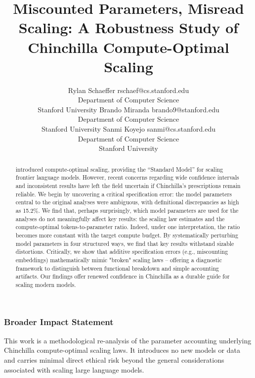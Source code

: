 \documentclass[10pt]{article} %
\title{Miscounted Parameters, Misread Scaling: A Robustness Study of Chinchilla Compute-Optimal Scaling}
\author{\name Rylan Schaeffer \email rschaef@cs.stanford.edu \\
      \addr Department of Computer Science\\
      Stanford University
      \AND
      \name Brando Miranda \email brando9@stanford.edu \\
      \addr Department of Computer Science\\
      Stanford University
      \AND
      \name Sanmi Koyejo \email sanmi@cs.stanford.edu \\
      \addr Department of Computer Science\\
      Stanford University}
\begin{document}
\maketitle

\begin{abstract}
\citet{hoffman2022chinchilla} introduced compute-optimal scaling, providing the ``Standard Model'' for scaling frontier language models.
However, recent concerns regarding wide confidence intervals and inconsistent results have left the field uncertain if Chinchilla’s prescriptions remain reliable. We begin by uncovering a critical specification error: the model parameters central to the original analyses were ambiguous, with definitional discrepancies as high as 15.2\%.
We find that, perhaps surprisingly, which model parameters are used for the analyses do not meaningfully affect key results: the scaling law estimates and the compute-optimal tokens-to-parameter ratio. Indeed, under one interpretation, the ratio becomes more constant with the target compute budget.
By systematically perturbing model parameters in four structured ways, we find that key results withstand sizable distortions. Critically, we show that additive specification errors (e.g., miscounting embeddings) mathematically mimic "broken" scaling laws -- offering a diagnostic framework to distinguish between functional breakdown and simple accounting artifacts. Our findings offer renewed confidence in Chinchilla as a durable guide for scaling modern models.
\end{abstract}






\subsubsection*{Broader Impact Statement}
This work is a methodological re-analysis of the parameter accounting underlying Chinchilla compute-optimal scaling laws. It introduces no new models or data and carries minimal direct ethical risk beyond the general considerations associated with scaling large language models.




\appendix


\end{document}
